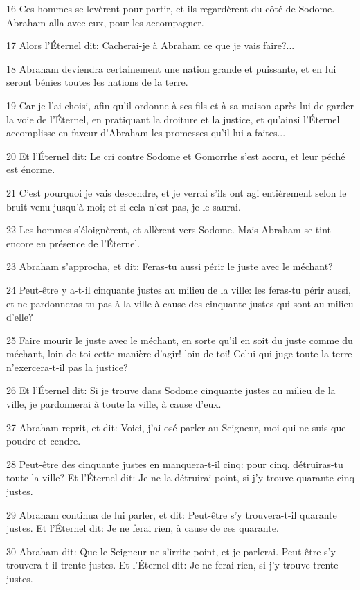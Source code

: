 \par 16 Ces hommes se levèrent pour partir, et ils regardèrent du côté de Sodome. Abraham alla avec eux, pour les accompagner.
\par 17 Alors l'Éternel dit: Cacherai-je à Abraham ce que je vais faire?...
\par 18 Abraham deviendra certainement une nation grande et puissante, et en lui seront bénies toutes les nations de la terre.
\par 19 Car je l'ai choisi, afin qu'il ordonne à ses fils et à sa maison après lui de garder la voie de l'Éternel, en pratiquant la droiture et la justice, et qu'ainsi l'Éternel accomplisse en faveur d'Abraham les promesses qu'il lui a faites...
\par 20 Et l'Éternel dit: Le cri contre Sodome et Gomorrhe s'est accru, et leur péché est énorme.
\par 21 C'est pourquoi je vais descendre, et je verrai s'ils ont agi entièrement selon le bruit venu jusqu'à moi; et si cela n'est pas, je le saurai.
\par 22 Les hommes s'éloignèrent, et allèrent vers Sodome. Mais Abraham se tint encore en présence de l'Éternel.
\par 23 Abraham s'approcha, et dit: Feras-tu aussi périr le juste avec le méchant?
\par 24 Peut-être y a-t-il cinquante justes au milieu de la ville: les feras-tu périr aussi, et ne pardonneras-tu pas à la ville à cause des cinquante justes qui sont au milieu d'elle?
\par 25 Faire mourir le juste avec le méchant, en sorte qu'il en soit du juste comme du méchant, loin de toi cette manière d'agir! loin de toi! Celui qui juge toute la terre n'exercera-t-il pas la justice?
\par 26 Et l'Éternel dit: Si je trouve dans Sodome cinquante justes au milieu de la ville, je pardonnerai à toute la ville, à cause d'eux.
\par 27 Abraham reprit, et dit: Voici, j'ai osé parler au Seigneur, moi qui ne suis que poudre et cendre.
\par 28 Peut-être des cinquante justes en manquera-t-il cinq: pour cinq, détruiras-tu toute la ville? Et l'Éternel dit: Je ne la détruirai point, si j'y trouve quarante-cinq justes.
\par 29 Abraham continua de lui parler, et dit: Peut-être s'y trouvera-t-il quarante justes. Et l'Éternel dit: Je ne ferai rien, à cause de ces quarante.
\par 30 Abraham dit: Que le Seigneur ne s'irrite point, et je parlerai. Peut-être s'y trouvera-t-il trente justes. Et l'Éternel dit: Je ne ferai rien, si j'y trouve trente justes.
